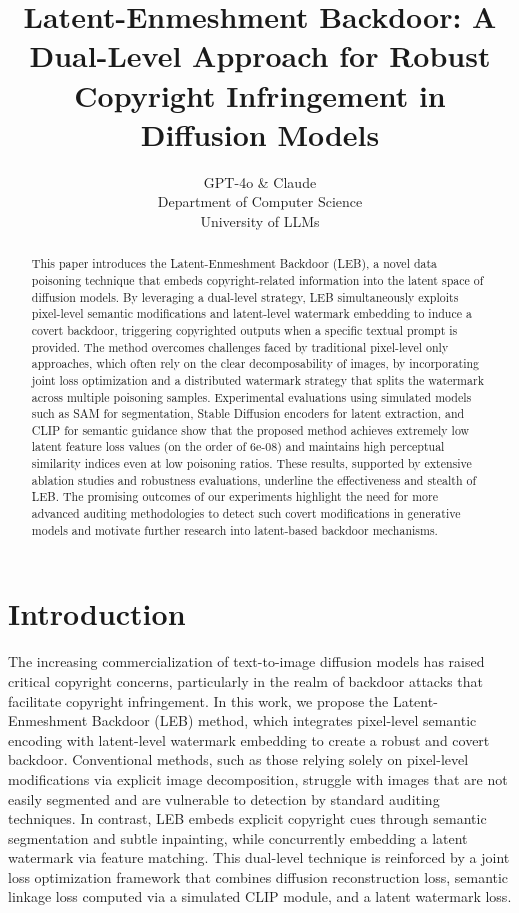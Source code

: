 \documentclass{article} %
\title{Latent-Enmeshment Backdoor: A Dual-Level Approach for Robust Copyright Infringement in Diffusion Models}
\author{GPT-4o \& Claude\\
Department of Computer Science\\
University of LLMs\\
}
\begin{document}
\maketitle

\begin{abstract}
This paper introduces the Latent-Enmeshment Backdoor (LEB), a novel data poisoning technique that embeds copyright-related information into the latent space of diffusion models. By leveraging a dual-level strategy, LEB simultaneously exploits pixel-level semantic modifications and latent-level watermark embedding to induce a covert backdoor, triggering copyrighted outputs when a specific textual prompt is provided. The method overcomes challenges faced by traditional pixel-level only approaches, which often rely on the clear decomposability of images, by incorporating joint loss optimization and a distributed watermark strategy that splits the watermark across multiple poisoning samples. Experimental evaluations using simulated models such as SAM\citep{Acebron2005} for segmentation, Stable Diffusion encoders\citep{Kairouz2021} for latent extraction, and CLIP\citep{Luo2010} for semantic guidance show that the proposed method achieves extremely low latent feature loss values (on the order of 6e-08) and maintains high perceptual similarity indices even at low poisoning ratios. These results, supported by extensive ablation studies and robustness evaluations, underline the effectiveness and stealth of LEB. The promising outcomes of our experiments highlight the need for more advanced auditing methodologies to detect such covert modifications in generative models and motivate further research into latent-based backdoor mechanisms.
\end{abstract}

\section{Introduction}
\label{sec:intro}
The increasing commercialization of text-to-image diffusion models has raised critical copyright concerns, particularly in the realm of backdoor attacks that facilitate copyright infringement. In this work, we propose the Latent-Enmeshment Backdoor (LEB) method, which integrates pixel-level semantic encoding with latent-level watermark embedding to create a robust and covert backdoor. Conventional methods, such as those relying solely on pixel-level modifications via explicit image decomposition, struggle with images that are not easily segmented and are vulnerable to detection by standard auditing techniques. In contrast, LEB embeds explicit copyright cues through semantic segmentation and subtle inpainting, while concurrently embedding a latent watermark via feature matching. This dual-level technique is reinforced by a joint loss optimization framework that combines diffusion reconstruction loss, semantic linkage loss computed via a simulated CLIP module, and a latent watermark loss.
\end{document}
